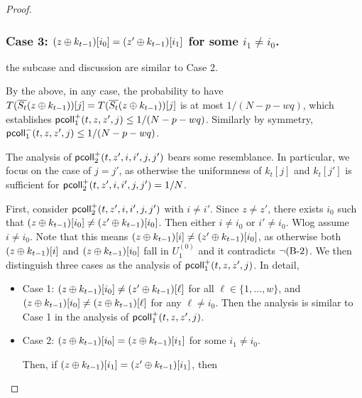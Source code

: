 \begin{proof}
\reducespace

\reducespace

\subsubsection{Case 3: $(z\oplus k_{t-1})[i_0]=(z'\oplus k_{t-1})[i_1]$ for some $i_1\neq i_0$.}

the subcase and discussion are similar to Case 2.



\arrangespace


By the above, in any case, the probability to have $T(\overline{S_t}(z\oplus k_{t-1}))[j]=T(\overline{S_t}(z\oplus k_{t-1}))[j]$ is at most $1/(N-p-wq)$, which establishes $\mathsf{pcoll}_{1}^+(t,z,z',j)\leq1/(N-p-wq)$. Similarly by symmetry, $\mathsf{pcoll}_{1}^-(t,z,z',j)\leq1/(N-p-wq)$.




\arrangespace


The analysis of $\mathsf{pcoll}_{2}^+(t,z',i,i',j,j')$ bears some resemblance. In particular, we focus on the case of $j=j'$, as otherwise the uniformness of $k_t[j]$ and $k_t[j']$ is sufficient for $\mathsf{pcoll}_{2}^+(t,z',i,i',j,j')=1/N$.


First, consider $\mathsf{pcoll}_{2}^+(t,z',i,i',j,j')$ with $i\neq i'$. Since $z\neq z'$, there exists $i_0$ such that $(z\oplus k_{t-1})[i_0]\neq(z'\oplus k_{t-1})[i_0]$. Then either $i\neq i_0$ or $i'\neq i_0$. Wlog assume $i\neq i_0$. Note that this means $(z\oplus k_{t-1})[i]\neq(z'\oplus k_{t-1})[i_0]$, as otherwise both $(z\oplus k_{t-1})[i]$ and $(z\oplus k_{t-1})[i_0]$ fall in $U_1^{(0)}$ and it contradicts $\neg\text{(B-2)}$. We then distinguish three cases as the analysis of $\mathsf{pcoll}_{1}^+(t,z,z',j)$. In detail,
%
\begin{itemize}
	\item Case 1: $(z\oplus k_{t-1})[i_0]\neq(z'\oplus k_{t-1})[\ell]$ for all $\ell\in\{1,\ldots,w\}$, and $(z\oplus k_{t-1})[i_0]\neq(z\oplus k_{t-1})[\ell]$ for any $\ell\neq i_0$. Then the analysis is similar to Case 1 in the analysis of $\mathsf{pcoll}_{1}^+(t,z,z',j)$.
	\item Case 2: $(z\oplus k_{t-1})[i_0]=(z\oplus k_{t-1})[i_1]$ for some $i_1\neq i_0$.
	
	Then, if $(z\oplus k_{t-1})[i_1]=(z'\oplus k_{t-1})[i_1]$, then 
	

\end{itemize}
\end{proof}
